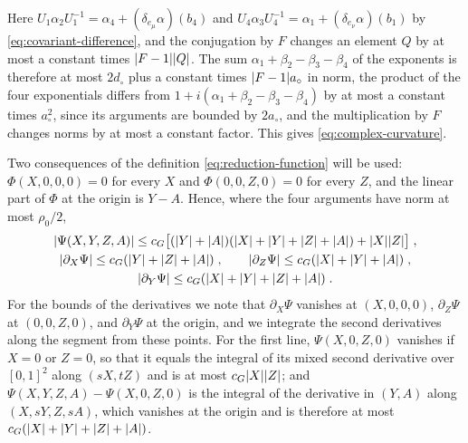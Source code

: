 \documentclass[11pt]{preprint}
\DeclarePairedDelimiter{\abs}{\lvert}{\rvert}
\numberwithin{equation}{section}
\theoremstyle{definition}
\theoremstyle{remark}
\theoremstyle{plain}
\begin{document}
Here $U_1\alpha_2U_1^{-1} = \alpha_4 + (\delta_{e_\mu}\alpha)(b_4)$ and $U_4\alpha_3U_4^{-1} = \alpha_1 + (\delta_{e_\nu}\alpha)(b_1)$ by \eqref{eq:covariant-difference}, and the conjugation by $F$ changes an element $Q$ by at most a constant times $\abs{F - 1}\abs Q$. The sum $\alpha_1 + \beta_2 - \beta_3 - \beta_4$ of the exponents is therefore at most $2d_\circ$ plus a constant times $\abs{F - 1}a_\circ$ in norm, the product of the four exponentials differs from $1 + i(\alpha_1 + \beta_2 - \beta_3 - \beta_4)$ by at most a constant times $a_\circ^2$, since its arguments are bounded by $2a_\circ$, and the multiplication by $F$ changes norms by at most a constant factor. This gives \eqref{eq:complex-curvature}.

Two consequences of the definition \eqref{eq:reduction-function} will be used: $\Phi(X, 0, 0, 0) = 0$ for every $X$ and $\Phi(0, 0, Z, 0) = 0$ for every $Z$, and the linear part of $\Phi$ at the origin is $Y - A$. Hence, where the four arguments have norm at most $\rho_0/2$,
\begin{equation}\label{eq:reduction-remainder}
\begin{gathered}
    \abs{\Psi(X, Y, Z, A)} \leq c_G\bigl[(\abs Y + \abs A)(\abs X + \abs Y + \abs Z + \abs A) + \abs X\abs Z\bigr]\;,\\
    \abs{\partial_X\Psi} \leq c_G(\abs Y + \abs Z + \abs A)\;,
    \qquad
    \abs{\partial_Z\Psi} \leq c_G(\abs X + \abs Y + \abs A)\;,\\
    \abs{\partial_Y\Psi} \leq c_G(\abs X + \abs Y + \abs Z + \abs A)\;.
\end{gathered}
\end{equation}
For the bounds of the derivatives we note that $\partial_X\Psi$ vanishes at $(X, 0, 0, 0)$, $\partial_Z\Psi$ at $(0, 0, Z, 0)$, and $\partial_Y\Psi$ at the origin, and we integrate the second derivatives along the segment from these points. For the first line, $\Psi(X, 0, Z, 0)$ vanishes if $X = 0$ or $Z = 0$, so that it equals the integral of its mixed second derivative over $[0, 1]^2$ along $(sX, tZ)$ and is at most $c_G\abs X\abs Z$; and $\Psi(X, Y, Z, A) - \Psi(X, 0, Z, 0)$ is the integral of the derivative in $(Y, A)$ along $(X, sY, Z, sA)$, which vanishes at the origin and is therefore at most $c_G(\abs X + \abs Y + \abs Z + \abs A)$.
\end{document}
